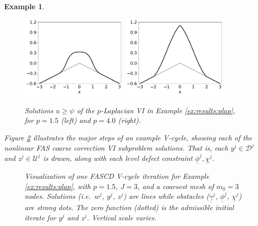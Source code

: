 \documentclass[letterpaper,final,12pt,reqno]{amsart}
\theoremstyle{cstyle}
\theoremstyle{cstyle*}
\theoremstyle{dstyle}
\newtheorem{example}[theorem]{Example}
\numberwithin{equation}{section}
\numberwithin{figure}{section}
\numberwithin{table}{section}
\numberwithin{theorem}{section}
\begin{document}
\begin{example}
\begin{figure}[ht]
\begin{center}
\includegraphics[width=0.45\textwidth]{fixfigs/plap1d1p5.pdf} \quad
\includegraphics[width=0.45\textwidth]{fixfigs/plap1d4p0.pdf}
\end{center}
\caption{Solutions $u\ge \psi$ of the $p$-Laplacian VI in Example \ref{ex:results:plap}, for $p=1.5$ (left) and $p=4.0$ (right).}
\label{fig:results:plap}
\end{figure}

Figure \ref{fig:imagesvcycle} illustrates the major steps of an example V-cycle, showing each of the nonlinear FAS coarse correction VI subproblem solutions.  That is, each $y^j \in \mathcal{D}^j$ and $z^j \in \mathcal{U}^j$ is drawn, along with each level defect constraint $\underline{\phi}^j,\underline{\chi}^j$.

\begin{figure}[ht]
\begin{center}

\end{center}
\caption{Visualization of one FASCD V-cycle iteration for Example \ref{ex:results:plap}, with $p=1.5$, $J=3$, and a coarsest mesh of $m_0=3$ nodes.  Solutions (i.e.~$w^j$, $y^j$, $z^j$) are lines while obstacles ($\underline{\gamma}^j$, $\underline{\phi}^j$, $\underline{\chi}^j$) are strong dots.  The zero function (dotted) is the admissible initial iterate for $y^j$ and $z^j$.  Vertical scale varies.}
\label{fig:imagesvcycle}
\end{figure}


\end{example}
\end{document}
